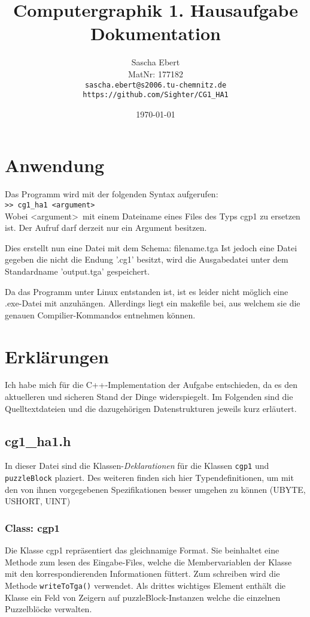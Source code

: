 \documentclass{article}
\title{Computergraphik 1. Hausaufgabe\\Dokumentation}
\author
{
	Sascha Ebert\\
	MatNr: 177182\\
	\texttt{sascha.ebert@s2006.tu-chemnitz.de}\\
	\texttt{https://github.com/Sighter/CG1\_HA1}\\
}
\date{\today}
\begin{document}
\maketitle

\section{Anwendung}
Das Programm wird mit der folgenden Syntax aufgerufen:\\
\texttt{>> cg1\_ha1 <argument>}\\
Wobei \textless argument\textgreater\ mit einem Dateiname eines Files des Typs
cgp1 zu ersetzen ist. Der Aufruf darf derzeit nur ein Argument besitzen.

Dies erstellt nun eine Datei mit dem Schema: filename.tga
Ist jedoch eine Datei gegeben die nicht die Endung '.cg1' besitzt,
wird die Ausgabedatei unter dem Standardname 'output.tga' gespeichert.

Da das Programm unter Linux entstanden ist, ist es leider nicht möglich eine .exe-Datei
mit anzuhängen. Allerdings liegt ein makefile bei, aus welchem sie die genauen Compilier-Kommandos
entnehmen können.

\section{Erklärungen}

Ich habe mich für die C++-Implementation der Aufgabe entschieden, da es den aktuelleren
und sicheren Stand der Dinge widerspiegelt.
Im Folgenden sind die Quelltextdateien und die dazugehörigen Datenstrukturen jeweils kurz erläutert.

\subsection{cg1\_ha1.h}
In dieser Datei sind die Klassen-\emph{Deklarationen} für die Klassen \texttt{cgp1} und \texttt{puzzleBlock} plaziert.
Des weiteren finden sich hier Typendefinitionen, um mit den von ihnen vorgegebenen Spezifikationen besser umgehen
zu können (UBYTE, USHORT, UINT)

\subsubsection{Class: cgp1}
Die Klasse cgp1 repräsentiert das gleichnamige Format. Sie beinhaltet eine Methode zum lesen des Eingabe-Files,
welche die Membervariablen der Klasse mit den korrespondierenden Informationen füttert. Zum schreiben wird die Methode
\texttt{writeToTga()} verwendet. Als drittes wichtiges Element enthält die Klasse ein Feld von Zeigern auf
puzzleBlock-Instanzen welche die einzelnen Puzzelblöcke verwalten.
\end{document}

